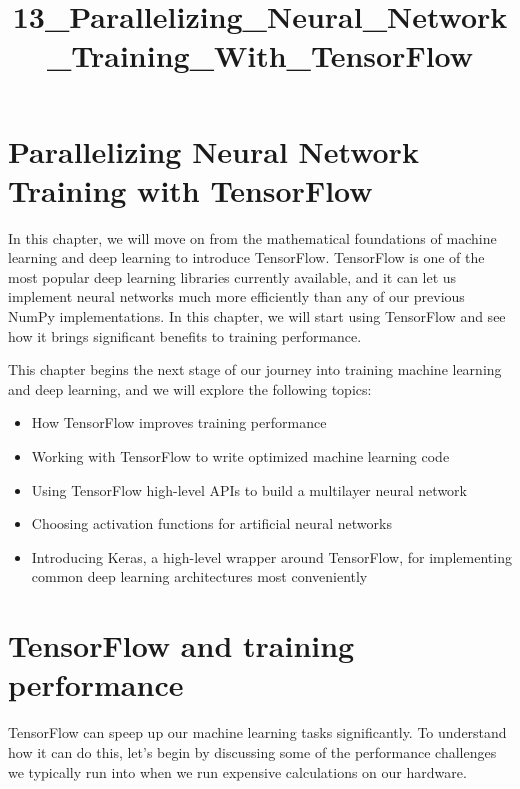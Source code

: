 \documentclass[11pt]{article}
\title{13\_Parallelizing\_Neural\_Network\_Training\_With\_TensorFlow}
\providecommand{\tightlist}{%
      \setlength{\itemsep}{0pt}\setlength{\parskip}{0pt}}
\begin{document}
    
    
    \maketitle
    
    

    
    \section{Parallelizing Neural Network Training with
TensorFlow}\label{parallelizing-neural-network-training-with-tensorflow}

    In this chapter, we will move on from the mathematical foundations of
machine learning and deep learning to introduce TensorFlow. TensorFlow
is one of the most popular deep learning libraries currently available,
and it can let us implement neural networks much more efficiently than
any of our previous NumPy implementations. In this chapter, we will
start using TensorFlow and see how it brings significant benefits to
training performance.

This chapter begins the next stage of our journey into training machine
learning and deep learning, and we will explore the following topics:

\begin{itemize}
\tightlist
\item
  How TensorFlow improves training performance
\item
  Working with TensorFlow to write optimized machine learning code
\item
  Using TensorFlow high-level APIs to build a multilayer neural network
\item
  Choosing activation functions for artificial neural networks
\item
  Introducing Keras, a high-level wrapper around TensorFlow, for
  implementing common deep learning architectures most conveniently
\end{itemize}

    \section{TensorFlow and training
performance}\label{tensorflow-and-training-performance}

    TensorFlow can speep up our machine learning tasks significantly. To
understand how it can do this, let's begin by discussing some of the
performance challenges we typically run into when we run expensive
calculations on our hardware.
\end{document}
